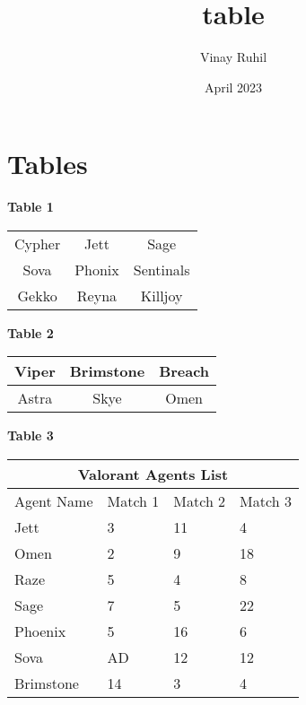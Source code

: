 \documentclass{article}
\title{table}
\author{Vinay Ruhil}
\date{April 2023}
\begin{document}
\maketitle

\section{Tables}
\begin{center}
\textbf{Table 1}
\end{center}

\begin{center}
\begin{tabular}{ |c|c|c| } 
 \hline
 Cypher & Jett & Sage \\ 
 Sova & Phonix & Sentinals \\ 
 Gekko & Reyna & Killjoy \\ 
 \hline
\end{tabular}
\end{center}



\begin{center}
\textbf{Table 2}
\end{center}


\begin{center}
\begin{tabularx}{0.4\textwidth} { |c|c|c| }
 \hline
 Viper & Brimstone & Breach \\
 \hline
 Astra  & Skye  & Omen  \\
\hline

\end{tabularx}
\end{center}



\begin{center}
\textbf{Table 3}
\end{center}





\begin{center}
\begin{tabular}{ |p{3cm}||p{3cm}|p{3cm}|p{3cm}|  }
 \hline
 \multicolumn{4}{|c|}{Valorant Agents List} \\
 \hline
 Agent Name& Match 1 & Match 2 & Match 3\\
 \hline
 Jett   & 3    &11&   4\\
 \hline
 Omen &   2  & 9   &18\\
 \hline
 Raze &5 & 4&  8\\
 \hline
 Sage    & 7 & 5&  22\\
 \hline
 Phoenix&   5  & 16&6\\
 \hline
 Sova& AD  & 12   &12\\
 \hline
 Brimstone& 14 & 3&4\\
 \hline
\end{tabular}
\end{center}
\end{document}
